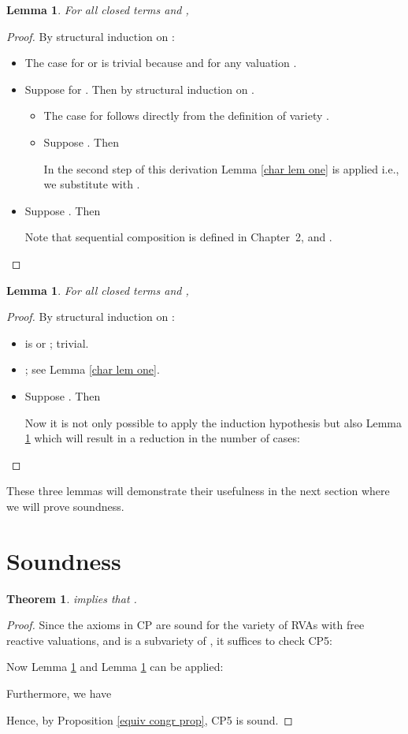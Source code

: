 \documentclass[a4paper,twoside,openright]{report}
\newtheorem{lem}[theorem]{Lemma}
\newtheorem{thm}[theorem]{Theorem}
\begin{document}
\begin{lem}\label{char lem two}
For all closed terms  and ,

\end{lem}
\begin{proof}
By structural induction on :
\begin{itemize}
\item The case for  or  is trivial because  and
 for any valuation .
\item Suppose  for . Then by structural induction on .
\begin{itemize}
\item The case for  follows directly from
the definition of variety .
\item Suppose . Then

In the second step of this derivation Lemma \ref{char lem
one} is applied i.e., we substitute  with .
\end{itemize}
\item Suppose . Then

Note that sequential composition  is defined in Chapter~2, and .
\end{itemize}
\end{proof}

\begin{lem}\label{char lem three}
For all closed terms  and ,

\end{lem}
\begin{proof}
By structural induction on :
\begin{itemize}
\item  is  or ; trivial.
\item ; see Lemma \ref{char lem one}.
\item Suppose . Then

Now it is not only possible to apply the induction hypothesis but also
Lemma \ref{char lem two} which will result in a reduction in the
number of cases:

\end{itemize}
\end{proof}

These three lemmas will demonstrate their usefulness in the next section where we will prove soundness.

\section{Soundness}
\begin{thm}
 implies that .
\end{thm}
\begin{proof}
Since the axioms in CP are sound for the variety  of RVAs with free reactive valuations, and  is a subvariety of , it suffices to check CP5:

Now Lemma \ref{char lem two} and Lemma \ref{char lem three} can be
applied:

Furthermore, we have


Hence, by Proposition \ref{equiv congr prop}, CP5 is sound.
\end{proof}
\end{document}
